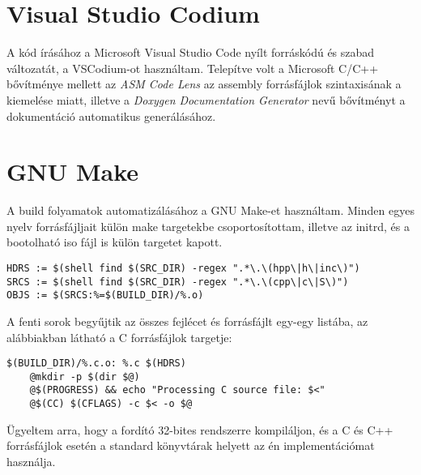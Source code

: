 \documentclass[12pt,numbers=noenddot]{report}
\begin{document}
\section{Visual Studio Codium}

A kód írásához a Microsoft Visual Studio Code nyílt forráskódú és szabad
változatát, a VSCodium-ot használtam. Telepítve volt a Microsoft C/C++
bővítménye mellett az \textit{ASM Code Lens} az assembly forrásfájlok
szintaxisának a kiemelése miatt, illetve a
\textit{Doxygen Documentation Generator} nevű bővítményt a dokumentáció
automatikus generálásához.


\section{GNU Make}

A build folyamatok automatizálásához a GNU Make-et használtam. Minden egyes
nyelv forrásfájljait külön make targetekbe csoportosítottam, illetve az initrd,
és a bootolható iso fájl is külön targetet kapott.

\begin{verbatim}
HDRS := $(shell find $(SRC_DIR) -regex ".*\.\(hpp\|h\|inc\)")
SRCS := $(shell find $(SRC_DIR) -regex ".*\.\(cpp\|c\|S\)")
OBJS := $(SRCS:%=$(BUILD_DIR)/%.o)
\end{verbatim}

\noindent A fenti sorok begyűjtik az összes fejlécet és forrásfájlt egy-egy
listába, az alábbiakban látható a C forrásfájlok targetje:

\begin{verbatim}
$(BUILD_DIR)/%.c.o: %.c $(HDRS)
    @mkdir -p $(dir $@)
    @$(PROGRESS) && echo "Processing C source file: $<"
    @$(CC) $(CFLAGS) -c $< -o $@
\end{verbatim}

\noindent Ügyeltem arra, hogy a fordító 32-bites rendszerre kompiláljon, és a C
és C++ forrásfájlok esetén a standard könyvtárak helyett az én implementációmat
használja.


\end{document}
